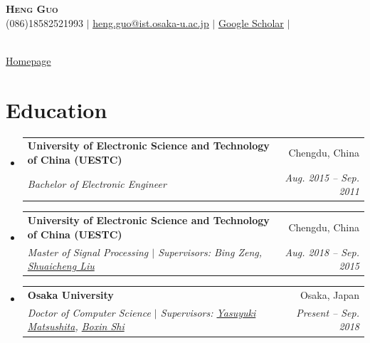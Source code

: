 \documentclass[UTF8]{ctexart}
\makeatletter
\newcommand{\resumeSubheading}[4]{
  \vspace{-2pt}\item
    \begin{tabular*}{0.97\textwidth}[t]{l@{\extracolsep{\fill}}r}
      \textbf{#1} & #2 \\
      \textit{\small#3} & \textit{\small #4} \\
    \end{tabular*}\vspace{-7pt}
}
\newcommand{\resumeSubHeadingListStart}{\begin{itemize}[leftmargin=0.15in, label={}]}
\newcommand{\resumeSubHeadingListEnd}{\end{itemize}}
\makeatother
\begin{document}

\begin{minipage}[c]{0.9\textwidth}
	\begin{center}
		\textbf{\Huge \scshape  Heng Guo} \\ \vspace{18pt}
		(086)18582521993 $|$ \href{mailto:heng.guo@ist.osaka-u.ac.jp}{\underline{heng.guo@ist.osaka-u.ac.jp}} $|$ 
		\href{https://scholar.google.com/citations?user=HKu6gF4AAAAJ&hl=zh-CN}{\underline{Google Scholar}} $|$ 
	\end{center}
\end{minipage}
\hspace{-2em}
\vspace{-0.5em}
\begin{minipage}[r]{0.06\textwidth}
	\centering
	\\
	\vspace{-3.5em}
	\href{https://gh-home.github.io/}{\underline{Homepage}}
\end{minipage}




\section{Education}
  \resumeSubHeadingListStart
    \resumeSubheading
      {University of Electronic Science and Technology of China (UESTC) }{Chengdu, China}
      {Bachelor of Electronic Engineer}{Aug. 2015 -- Sep. 2011}
  \resumeSubheading
      {University of Electronic Science and Technology of China (UESTC)}{Chengdu, China}
      {Master of Signal Processing $|$ Supervisors: Bing Zeng, \href{http://www.liushuaicheng.org/}{Shuaicheng Liu}}{Aug. 2018 -- Sep. 2015}
   \resumeSubheading
 		{Osaka University}{Osaka, Japan}
 		{Doctor of Computer Science $|$ Supervisors: \href{http://cvl.ist.osaka-u.ac.jp/en/member/matsushita/}{Yasuyuki Matsushita}, \href{https://cs.pku.edu.cn/info/1073/1888.htm}{Boxin Shi}}{Present -- Sep. 2018}
  \resumeSubHeadingListEnd
\end{document}
